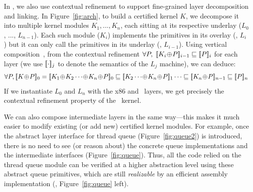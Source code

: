 In \CTOS, we also use contextual refinement to support fine-grained
layer decomposition and linking.  In Figure~\ref{fig:arch}, to build a
certified kernel $K$, we decompose it into multiple kernel modules
$K_1,...,K_n$, each sitting at its respective underlay ($L_0$, ...,
$L_{n-1}$). Each such module ($K_i$) implements the primitives in its
overlay (\ie, $L_i$) but it can only call the primitives in its
underlay (\ie, $L_{i-1}$).  Using vertical composition~\cite{dscal15}, from
the contextual refinement $\forall
P,\;\sem{i-1}{K_i\join{}P}\Refrel{}\sem{i}{P}$ for each layer (we use
$\sem{j}{\cdot}$ to denote the semantics of the $L_j$ machine), we can
deduce:
$$\forall P, \sem{0}{K\join{}P} =
\sem{0}{K_1\join{}K_2\cdots\join{}K_n\join{}P} \Refrel
\sem{1}{K_2\cdots\join{}K_n\join{}P} \cdots \Refrel
\sem{n-1}{K_n\join{}P} \Refrel \sem{n}{P}$$
If we instantiate $L_0$
and $L_n$ with the x86 and \mCTOS\ layers, we get precisely the
contextual refinement property of the \mCTOS\ kernel. 

We can also
compose intermediate layers in the same way---this makes it much
easier to modify existing (or add new) certified kernel modules.
For example, once the abstract layer interface
for thread queue (\cf{}Figure~\ref{fig:queue2}) is introduced,
there is no need to see (or reason about) 
the concrete queue implementations
and the intermediate interfaces (\cf{}Figure~\ref{fig:queue}). 
Thus, all the code relied on the thread queue module can be verified
at a higher abstraction level using these abstract queue primitives,
which are still {\em realizable} by an efficient assembly implementation
(\ie, Figure~\ref{fig:queue} left).


